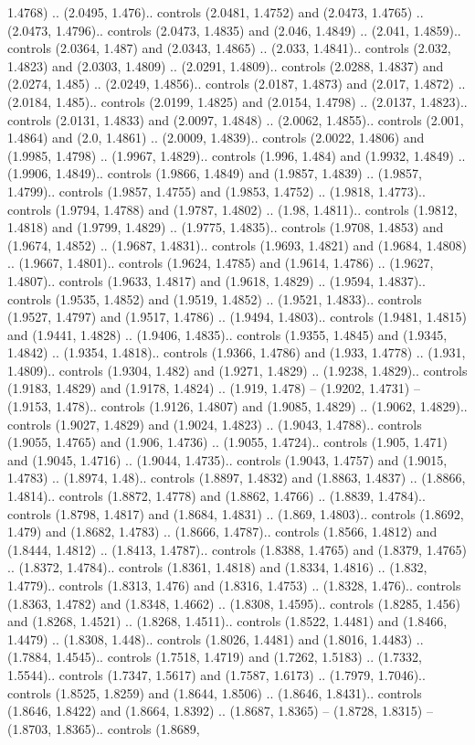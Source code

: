 1.4768) .. (2.0495, 1.476).. controls (2.0481, 1.4752) and (2.0473, 1.4765) .. (2.0473, 1.4796).. controls (2.0473, 1.4835) and (2.046, 1.4849) .. (2.041, 1.4859).. controls (2.0364, 1.487) and (2.0343, 1.4865) .. (2.033, 1.4841).. controls (2.032, 1.4823) and (2.0303, 1.4809) .. (2.0291, 1.4809).. controls (2.0288, 1.4837) and (2.0274, 1.485) .. (2.0249, 1.4856).. controls (2.0187, 1.4873) and (2.017, 1.4872) .. (2.0184, 1.485).. controls (2.0199, 1.4825) and (2.0154, 1.4798) .. (2.0137, 1.4823).. controls (2.0131, 1.4833) and (2.0097, 1.4848) .. (2.0062, 1.4855).. controls (2.001, 1.4864) and (2.0, 1.4861) .. (2.0009, 1.4839).. controls (2.0022, 1.4806) and (1.9985, 1.4798) .. (1.9967, 1.4829).. controls (1.996, 1.484) and (1.9932, 1.4849) .. (1.9906, 1.4849).. controls (1.9866, 1.4849) and (1.9857, 1.4839) .. (1.9857, 1.4799).. controls (1.9857, 1.4755) and (1.9853, 1.4752) .. (1.9818, 1.4773).. controls (1.9794, 1.4788) and (1.9787, 1.4802) .. (1.98, 1.4811).. controls (1.9812, 1.4818) and (1.9799, 1.4829) .. (1.9775, 1.4835).. controls (1.9708, 1.4853) and (1.9674, 1.4852) .. (1.9687, 1.4831).. controls (1.9693, 1.4821) and (1.9684, 1.4808) .. (1.9667, 1.4801).. controls (1.9624, 1.4785) and (1.9614, 1.4786) .. (1.9627, 1.4807).. controls (1.9633, 1.4817) and (1.9618, 1.4829) .. (1.9594, 1.4837).. controls (1.9535, 1.4852) and (1.9519, 1.4852) .. (1.9521, 1.4833).. controls (1.9527, 1.4797) and (1.9517, 1.4786) .. (1.9494, 1.4803).. controls (1.9481, 1.4815) and (1.9441, 1.4828) .. (1.9406, 1.4835).. controls (1.9355, 1.4845) and (1.9345, 1.4842) .. (1.9354, 1.4818).. controls (1.9366, 1.4786) and (1.933, 1.4778) .. (1.931, 1.4809).. controls (1.9304, 1.482) and (1.9271, 1.4829) .. (1.9238, 1.4829).. controls (1.9183, 1.4829) and (1.9178, 1.4824) .. (1.919, 1.478) -- (1.9202, 1.4731) -- (1.9153, 1.478).. controls (1.9126, 1.4807) and (1.9085, 1.4829) .. (1.9062, 1.4829).. controls (1.9027, 1.4829) and (1.9024, 1.4823) .. (1.9043, 1.4788).. controls (1.9055, 1.4765) and (1.906, 1.4736) .. (1.9055, 1.4724).. controls (1.905, 1.471) and (1.9045, 1.4716) .. (1.9044, 1.4735).. controls (1.9043, 1.4757) and (1.9015, 1.4783) .. (1.8974, 1.48).. controls (1.8897, 1.4832) and (1.8863, 1.4837) .. (1.8866, 1.4814).. controls (1.8872, 1.4778) and (1.8862, 1.4766) .. (1.8839, 1.4784).. controls (1.8798, 1.4817) and (1.8684, 1.4831) .. (1.869, 1.4803).. controls (1.8692, 1.479) and (1.8682, 1.4783) .. (1.8666, 1.4787).. controls (1.8566, 1.4812) and (1.8444, 1.4812) .. (1.8413, 1.4787).. controls (1.8388, 1.4765) and (1.8379, 1.4765) .. (1.8372, 1.4784).. controls (1.8361, 1.4818) and (1.8334, 1.4816) .. (1.832, 1.4779).. controls (1.8313, 1.476) and (1.8316, 1.4753) .. (1.8328, 1.476).. controls (1.8363, 1.4782) and (1.8348, 1.4662) .. (1.8308, 1.4595).. controls (1.8285, 1.456) and (1.8268, 1.4521) .. (1.8268, 1.4511).. controls (1.8522, 1.4481) and (1.8466, 1.4479) .. (1.8308, 1.448).. controls (1.8026, 1.4481) and (1.8016, 1.4483) .. (1.7884, 1.4545).. controls (1.7518, 1.4719) and (1.7262, 1.5183) .. (1.7332, 1.5544).. controls (1.7347, 1.5617) and (1.7587, 1.6173) .. (1.7979, 1.7046).. controls (1.8525, 1.8259) and (1.8644, 1.8506) .. (1.8646, 1.8431).. controls (1.8646, 1.8422) and (1.8664, 1.8392) .. (1.8687, 1.8365) -- (1.8728, 1.8315) -- (1.8703, 1.8365).. controls (1.8689, 